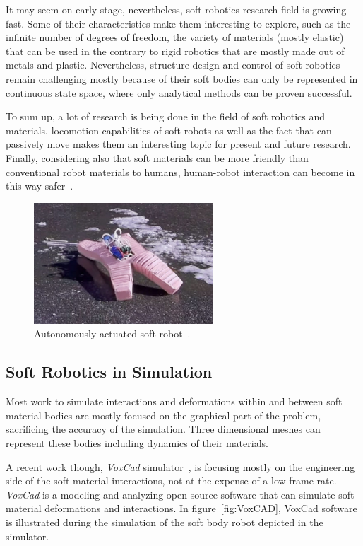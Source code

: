 It may seem on early stage, nevertheless, soft robotics research field is growing fast. Some of their characteristics make them interesting to explore, such as the infinite number of degrees of freedom, the variety of materials (mostly elastic) that can be used in the contrary to rigid robotics that are mostly made out of metals and plastic. Nevertheless, structure design and control of soft robotics remain challenging mostly because of their soft bodies can only be represented in continuous state space, where only analytical methods can be proven successful.

To sum up, a lot of research is being done in the field of soft robotics and materials, locomotion capabilities of soft robots as well as the fact that can passively move makes them an interesting topic for present and future research. Finally, considering also that soft materials can be more friendly than conventional robot materials to humans, human-robot interaction can become in this way safer~\cite{sanan2011continuum}.


\begin{figure}[t!]
\centering
\includegraphics[width=0.6\textwidth]{../Figures/Misc/softbot.jpg}
\caption{Autonomously actuated soft robot~\cite{tolleyresilient}.}
\label{fig:softbot}
\end{figure}


\subsection{Soft Robotics in Simulation}

Most work to simulate interactions and deformations within and between soft material bodies are mostly focused on the graphical part of the problem, sacrificing the accuracy of the simulation. Three dimensional meshes can represent these bodies including dynamics of their materials. 

A recent work though, \emph{VoxCad} simulator~\cite{hiller2012dynamic}, is focusing mostly on the engineering side of the soft material interactions, not at the expense of a low frame rate. \emph{VoxCad} is a modeling and analyzing open-source software that can simulate soft material deformations and interactions. In figure~\ref{fig:VoxCAD}, VoxCad software is illustrated during the simulation of the soft body robot depicted in the simulator.

